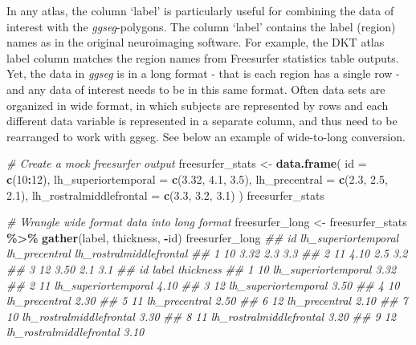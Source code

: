 \documentclass[fleqn,10pt]{wlpeerj} %
\newenvironment{Shaded}{\begin{snugshade}}{\end{snugshade}}
\newcommand{\CommentTok}[1]{\textcolor[rgb]{0.56,0.35,0.01}{\textit{#1}}}
\newcommand{\DataTypeTok}[1]{\textcolor[rgb]{0.13,0.29,0.53}{#1}}
\newcommand{\DecValTok}[1]{\textcolor[rgb]{0.00,0.00,0.81}{#1}}
\newcommand{\FloatTok}[1]{\textcolor[rgb]{0.00,0.00,0.81}{#1}}
\newcommand{\KeywordTok}[1]{\textcolor[rgb]{0.13,0.29,0.53}{\textbf{#1}}}
\newcommand{\NormalTok}[1]{#1}
\newcommand{\OperatorTok}[1]{\textcolor[rgb]{0.81,0.36,0.00}{\textbf{#1}}}
\newcommand{\StringTok}[1]{\textcolor[rgb]{0.31,0.60,0.02}{#1}}
\begin{document}
\normalsize

In any atlas, the column `label' is particularly useful for combining the data of interest with the \emph{ggseg}-polygons.
The column `label' contains the label (region) names as in the original neuroimaging software.
For example, the DKT atlas label column matches the region names from Freesurfer statistics table outputs.
Yet, the data in \emph{ggseg} is in a long format - that is each region has a single row - and any data of interest needs to be in this same format.
Often data sets are organized in wide format, in which subjects are represented by rows and each different data variable is represented in a separate column, and thus need to be rearranged to work with ggseg.
See below an example of wide-to-long conversion.

\small

\begin{Shaded}
\begin{Highlighting}[]
\CommentTok{\# Create a mock freesurfer output}
\NormalTok{freesurfer\_stats <{-}}\StringTok{ }\KeywordTok{data.frame}\NormalTok{(}
  \DataTypeTok{id =} \KeywordTok{c}\NormalTok{(}\DecValTok{10}\OperatorTok{:}\DecValTok{12}\NormalTok{),}
  \DataTypeTok{lh\_superiortemporal =} \KeywordTok{c}\NormalTok{(}\FloatTok{3.32}\NormalTok{, }\FloatTok{4.1}\NormalTok{, }\FloatTok{3.5}\NormalTok{),}
  \DataTypeTok{lh\_precentral =} \KeywordTok{c}\NormalTok{(}\FloatTok{2.3}\NormalTok{, }\FloatTok{2.5}\NormalTok{, }\FloatTok{2.1}\NormalTok{),}
  \DataTypeTok{lh\_rostralmiddlefrontal =} \KeywordTok{c}\NormalTok{(}\FloatTok{3.3}\NormalTok{, }\FloatTok{3.2}\NormalTok{, }\FloatTok{3.1}\NormalTok{)}
\NormalTok{)}
\NormalTok{freesurfer\_stats}

\CommentTok{\# Wrangle wide format data into long format}
\NormalTok{freesurfer\_long <{-}}\StringTok{ }\NormalTok{freesurfer\_stats }\OperatorTok{\%>\%}
\StringTok{  }\KeywordTok{gather}\NormalTok{(label, thickness, }\OperatorTok{{-}}\NormalTok{id)}
\NormalTok{freesurfer\_long}
\CommentTok{\#\#   id lh\_superiortemporal lh\_precentral lh\_rostralmiddlefrontal}
\CommentTok{\#\# 1 10                3.32           2.3                     3.3}
\CommentTok{\#\# 2 11                4.10           2.5                     3.2}
\CommentTok{\#\# 3 12                3.50           2.1                     3.1}
\CommentTok{\#\#   id                   label thickness}
\CommentTok{\#\# 1 10     lh\_superiortemporal      3.32}
\CommentTok{\#\# 2 11     lh\_superiortemporal      4.10}
\CommentTok{\#\# 3 12     lh\_superiortemporal      3.50}
\CommentTok{\#\# 4 10           lh\_precentral      2.30}
\CommentTok{\#\# 5 11           lh\_precentral      2.50}
\CommentTok{\#\# 6 12           lh\_precentral      2.10}
\CommentTok{\#\# 7 10 lh\_rostralmiddlefrontal      3.30}
\CommentTok{\#\# 8 11 lh\_rostralmiddlefrontal      3.20}
\CommentTok{\#\# 9 12 lh\_rostralmiddlefrontal      3.10}
\end{Highlighting}
\end{Shaded}
\end{document}
